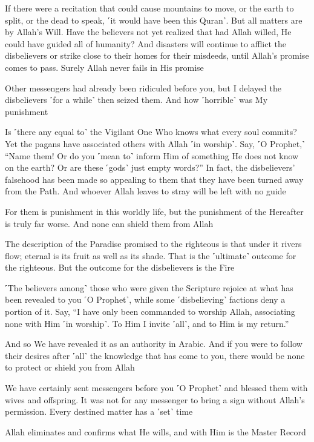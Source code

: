If there were a recitation that could cause mountains to move, or the earth to split, or the dead to speak, ˹it would have been this Quran˺. But all matters are by Allah’s Will. Have the believers not yet realized that had Allah willed, He could have guided all of humanity? And disasters will continue to afflict the disbelievers or strike close to their homes for their misdeeds, until Allah’s promise comes to pass. Surely Allah never fails in His promise

Other messengers had already been ridiculed before you, but I delayed the disbelievers ˹for a while˺ then seized them. And how ˹horrible˺ was My punishment

Is ˹there any equal to˺ the Vigilant One Who knows what every soul commits? Yet the pagans have associated others with Allah ˹in worship˺. Say, ˹O Prophet,˺ “Name them! Or do you ˹mean to˺ inform Him of something He does not know on the earth? Or are these ˹gods˺ just empty words?” In fact, the disbelievers’ falsehood has been made so appealing to them that they have been turned away from the Path. And whoever Allah leaves to stray will be left with no guide

For them is punishment in this worldly life, but the punishment of the Hereafter is truly far worse. And none can shield them from Allah

The description of the Paradise promised to the righteous is that under it rivers flow; eternal is its fruit as well as its shade. That is the ˹ultimate˺ outcome for the righteous. But the outcome for the disbelievers is the Fire

˹The believers among˺ those who were given the Scripture rejoice at what has been revealed to you ˹O Prophet˺, while some ˹disbelieving˺ factions deny a portion of it. Say, “I have only been commanded to worship Allah, associating none with Him ˹in worship˺. To Him I invite ˹all˺, and to Him is my return.”

And so We have revealed it as an authority in Arabic. And if you were to follow their desires after ˹all˺ the knowledge that has come to you, there would be none to protect or shield you from Allah

We have certainly sent messengers before you ˹O Prophet˺ and blessed them with wives and offspring. It was not for any messenger to bring a sign without Allah’s permission. Every destined matter has a ˹set˺ time

Allah eliminates and confirms what He wills, and with Him is the Master Record

